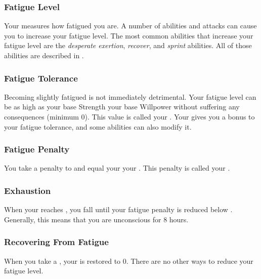         \subsubsection{Fatigue Level}\label{Fatigue Level}
            Your  measures how fatigued you are.
            A number of abilities and attacks can cause you to increase your fatigue level.
            The most common abilities that increase your fatigue level are the \textit{desperate exertion}, \textit{recover}, and \textit{sprint} abilities.
            All of those abilities are described in .

            \subsubsection{Fatigue Tolerance}\label{Fatigue Tolerance}
                Becoming slightly fatigued is not immediately detrimental.
                Your fatigue level can be as high as your base Strength \add your base Willpower without suffering any consequences (minimum 0).
                This value is called your .
                Your  gives you a bonus to your fatigue tolerance, and some abilities can also modify it.

            \subsubsection{Fatigue Penalty}\label{Fatigue Penalty}
                You take a penalty to  and  equal your  \sub your .
                This penalty is called your .

        \subsubsection{Exhaustion}\label{Exhaustion}
            When your  reaches , you fall \unconscious until your fatigue penalty is reduced below .
            Generally, this means that you are unconscious for 8 hours.

        \subsubsection{Recovering From Fatigue}
            When you take a , your  is restored to 0.
            There are no other ways to reduce your fatigue level.

